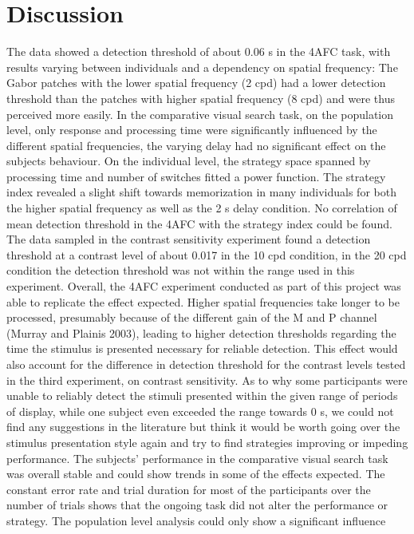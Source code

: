 \newpage
\section{Discussion}
The data showed a detection threshold of about 0.06 s in the 4AFC task, with results varying between individuals and a dependency on spatial frequency: The Gabor patches with the lower spatial frequency (2 cpd) had a lower detection threshold than the patches with higher spatial frequency (8 cpd) and were thus perceived more easily. In the comparative visual search task, on the population level, only response and processing time were significantly influenced by the different spatial frequencies, the varying delay had no significant effect on the subjects behaviour. On the individual level, the strategy space spanned by processing time and number of switches fitted a power function. The strategy index revealed a slight shift towards memorization in many individuals for both the higher spatial frequency as well as the 2 s delay condition. No correlation of mean detection threshold in the 4AFC with the strategy index could be found. The data sampled in the contrast sensitivity experiment found a detection threshold at a contrast level of about 0.017 in the 10 cpd condition, in the 20 cpd condition the detection threshold was not within the range used in this experiment.
\newline
Overall, the 4AFC experiment conducted as part of this project was able to replicate the effect expected. Higher spatial frequencies take longer to be processed, presumably because of the different gain of the M and P channel (Murray and Plainis 2003), leading to higher detection thresholds regarding the time the stimulus is presented necessary for reliable detection. This effect would also account for the difference in detection threshold for the contrast levels tested in the third experiment, on contrast sensitivity. 
\newline 
As to why some participants were unable to reliably detect the stimuli presented within the given range of periods of display, while one subject even exceeded the range towards 0 s, we could not find any suggestions in the literature but think it would be worth going over the stimulus presentation style again and try to find strategies improving or impeding performance. 
\newline
\newline
The subjects' performance in the comparative visual search task was overall stable and could show trends in some of the effects expected. The constant error rate and trial duration for most of the participants over the number of trials shows that the ongoing task did not alter the performance or strategy. The population level analysis could only show a significant influence 
